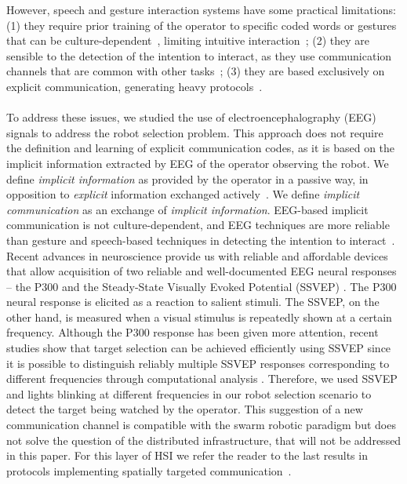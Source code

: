 \documentclass[smallextended]{svjour3}
\begin{document}
However, speech and gesture interaction systems have some practical limitations: (1) they require prior training of the operator to specific coded words or gestures that can be culture-dependent~\cite{Trovato2013}, limiting intuitive interaction~\cite{Kirchner2015};
(2) they are sensible to the detection of the intention to interact, as they use communication channels that are common with other tasks~\cite{Rzepecki2012}; (3) they are based exclusively on explicit communication, generating heavy protocols~\cite{Kirchner2015}.\\
\\ 
To address these issues, we studied the use of electroencephalography (EEG) signals to address the robot selection problem. 
This approach does not require the definition and learning of explicit communication codes, as it is based on the implicit information extracted by EEG of the operator observing the robot. 
We define \textit{implicit information} as provided by the operator in a passive way, in opposition to \textit{explicit} information exchanged actively~\cite{Kirchner2015}.
We define \textit{implicit communication} as an exchange of \textit{implicit information}.
EEG-based implicit communication is not culture-dependent, and EEG techniques are more reliable than gesture and speech-based techniques in detecting the intention to interact~\cite{Rzepecki2012}.
Recent advances in neuroscience provide us with reliable and affordable devices that allow acquisition of two reliable and well-documented EEG neural responses -- the P300 and the Steady-State Visually Evoked Potential (SSVEP) \cite{Beverina2003,Bi2013,Zhu2010}. 
The P300 neural response is elicited as a reaction to salient stimuli. 
The SSVEP, on the other hand, is measured when a visual stimulus is repeatedly shown at a certain frequency. Although the P300 response has been given more attention, recent studies show that target selection can be achieved efficiently using SSVEP since it is possible to distinguish reliably multiple SSVEP responses corresponding to different frequencies through computational analysis \cite{SSVEPfiability}.
Therefore, we used SSVEP and lights blinking at different frequencies in our robot selection scenario to detect the target being watched by the operator. This suggestion of a new communication channel is compatible with the swarm robotic paradigm but does not solve the question of the distributed infrastructure, that will not be addressed in this paper. For this layer of HSI we refer the reader to the last results in protocols implementing spatially targeted communication~\cite{mathews2015spatially}.\\ 
\end{document}
